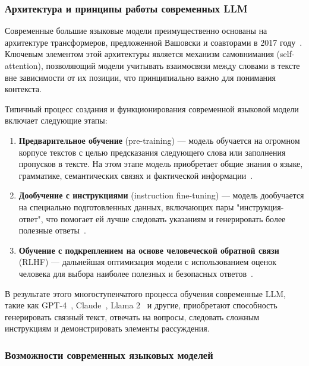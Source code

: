 \subsubsection{Архитектура и принципы работы современных LLM}

Современные большие языковые модели преимущественно основаны на архитектуре трансформеров, предложенной Вашовски и соавторами в 2017 году~\cite{vaswani2017attention}. Ключевым элементом этой архитектуры является механизм самовнимания (self-attention), позволяющий модели учитывать взаимосвязи между словами в тексте вне зависимости от их позиции, что принципиально важно для понимания контекста.

Типичный процесс создания и функционирования современной языковой модели включает следующие этапы:

\begin{enumerate}
    \item \textbf{Предварительное обучение} (pre-training) — модель обучается на огромном корпусе текстов с целью предсказания следующего слова или заполнения пропусков в тексте. На этом этапе модель приобретает общие знания о языке, грамматике, семантических связях и фактической информации~\cite{brown2020language}.

    \item \textbf{Дообучение с инструкциями} (instruction fine-tuning) — модель дообучается на специально подготовленных данных, включающих пары "{}инструкция-ответ"{}, что помогает ей лучше следовать указаниям и генерировать более полезные ответы~\cite{wei2022finetuned}.

    \item \textbf{Обучение с подкреплением на основе человеческой обратной связи} (RLHF) — дальнейшая оптимизация модели с использованием оценок человека для выбора наиболее полезных и безопасных ответов~\cite{ouyang2022training}.
\end{enumerate}

В результате этого многоступенчатого процесса обучения современные LLM, такие как GPT-4~\cite{openai2023gpt4}, Claude~\cite{claude2023}, Llama 2~\cite{touvron2023llama} и другие, приобретают способность генерировать связный текст, отвечать на вопросы, следовать сложным инструкциям и демонстрировать элементы рассуждения.

\subsubsection{Возможности современных языковых моделей}

